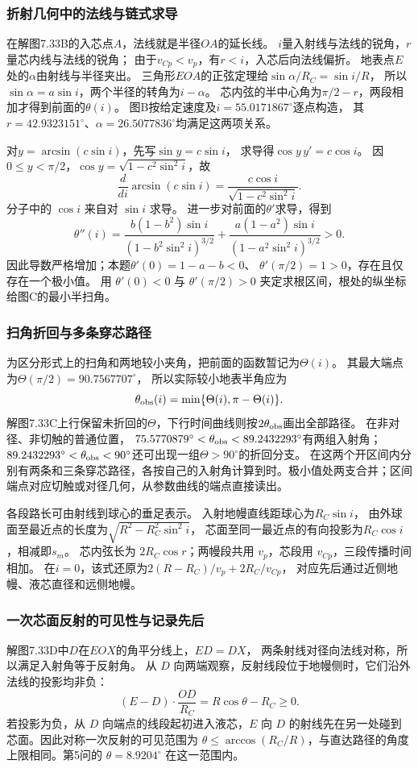 \documentclass[UTF8,fontset=fandol,a4paper,11pt]{ctexart}
\begin{document}
\subsubsection*{折射几何中的法线与链式求导}
在解图7.33B的入芯点$A$，法线就是半径$OA$的延长线。
$i$量入射线与法线的锐角，$r$量芯内线与法线的锐角；
由于$v_{Cp}<v_p$，有$r<i$，入芯后向法线偏折。
地表点$E$处的$\alpha$由射线与半径夹出。
三角形$EOA$的正弦定理给$\sin\alpha/R_C=\sin i/R$，
所以$\sin\alpha=a\sin i$，两个半径的转角为$i-\alpha$。
芯内弦的半中心角为$\pi/2-r$，两段相加才得到前面的$\theta(i)$。
图B按给定速度及$i=55.0171867^\circ$逐点构造，
其$r=42.9323151^\circ$、$\alpha=26.5077836^\circ$均满足这两项关系。

对$y=\arcsin(c\sin i)$，先写$\sin y=c\sin i$，
求导得$\cos y\,y'=c\cos i$。
因$0\le y<\pi/2$，$\cos y=\sqrt{1-c^2\sin^2i}$，故
\[
\frac{d}{di}\arcsin(c\sin i)
=\frac{c\cos i}{\sqrt{1-c^2\sin^2i}}.
\]
分子中的 $\cos i$ 来自对 $\sin i$ 求导。
进一步对前面的$\theta'$求导，得到
\[
\theta''(i)=\frac{b(1-b^2)\sin i}{(1-b^2\sin^2i)^{3/2}}
+\frac{a(1-a^2)\sin i}{(1-a^2\sin^2i)^{3/2}}>0.
\]
因此导数严格增加；本题$\theta'(0)=1-a-b<0$、
$\theta'(\pi/2)=1>0$，存在且仅存在一个极小值。
用 $\theta'(0)<0$ 与 $\theta'(\pi/2)>0$ 夹定求根区间，根处的纵坐标给图C的最小半扫角。

\subsubsection*{扫角折回与多条穿芯路径}
为区分形式上的扫角和两地较小夹角，把前面的函数暂记为$\Theta(i)$。
其最大端点为$\Theta(\pi/2)=90.7567707^\circ$，
所以实际较小地表半角应为
\[
\theta_{\rm obs}(i)=\min\{\Theta(i),\pi-\Theta(i)\}.
\]
解图7.33C上行保留未折回的$\Theta$，下行时间曲线则按$2\theta_{\rm obs}$画出全部路径。
在非对径、非切触的普通位置，
$75.5770879^\circ<\theta_{\rm obs}<89.2432293^\circ$有两组入射角；
$89.2432293^\circ<\theta_{\rm obs}<90^\circ$还可出现一组$\Theta>90^\circ$的折回分支。
在这两个开区间内分别有两条和三条穿芯路径，各按自己的入射角计算到时。极小值处两支合并；区间端点对应切触或对径几何，从参数曲线的端点直接读出。

各段路长可由射线到球心的垂足表示。
入射地幔直线距球心为$R_C\sin i$，
由外球面至最近点的长度为$\sqrt{R^2-R_C^2\sin^2i}$，
芯面至同一最近点的有向投影为$R_C\cos i$，相减即$s_m$。
芯内弦长为 $2R_C\cos r$；两幔段共用 $v_p$，芯段用 $v_{Cp}$，三段传播时间相加。
在$i=0$，该式还原为$2(R-R_C)/v_p+2R_C/v_{Cp}$，
对应先后通过近侧地幔、液芯直径和远侧地幔。

\subsubsection*{一次芯面反射的可见性与记录先后}
解图7.33D中$D$在$EOX$的角平分线上，$ED=DX$，
两条射线对径向法线对称，所以满足入射角等于反射角。
从 $D$ 向两端观察，反射线段位于地幔侧时，它们沿外法线的投影均非负：
\[
(E-D)\cdot\frac{OD}{R_C}=R\cos\theta-R_C\ge0.
\]
若投影为负，从 $D$ 向端点的线段起初进入液芯，$E$ 向 $D$ 的射线先在另一处碰到芯面。因此对称一次反射的可见范围为 $\theta\le\arccos(R_C/R)$，与直达路径的角度上限相同。第5问的 $\theta=8.9204^\circ$ 在这一范围内。
\end{document}
